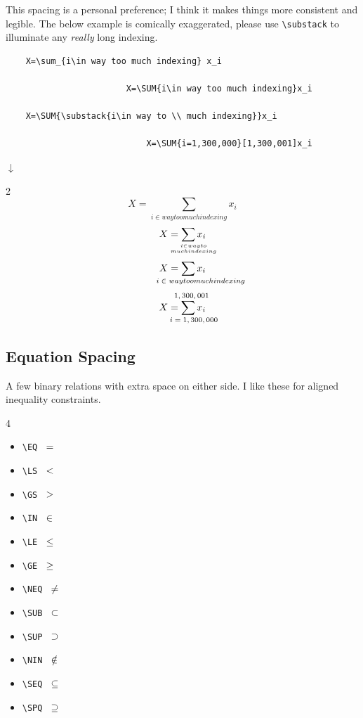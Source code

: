 \documentclass{article}
\begin{document}
This spacing is a personal preference; I think it makes things more consistent and legible. The below example is comically exaggerated, please use \verb|\substack| to illuminate any \emph{really} long indexing.
\begin{tcolorbox}
	\begin{verbatim}
	X=\sum_{i\in way too much indexing} x_i
	
	                    X=\SUM{i\in way too much indexing}x_i
	                    
	X=\SUM{\substack{i\in way to \\ much indexing}}x_i
	   
	                        X=\SUM{i=1,300,000}[1,300,001]x_i
	\end{verbatim}
	\begin{center}$\downarrow$\end{center}
	\begin{multicols}{2}~\VTRg\vtrg
	$$
	X=\sum_{i\in way too much indexing} x_i
	$$
	$$
	X=\SUM{\substack{i\in way to \\ much indexing}}x_i
	$$
	$$
	X=\SUM{i\in way too much indexing}x_i
	$$
	$$
	X=\SUM{i=1,300,000}[1,300,001]x_i
	$$
	\end{multicols}
\end{tcolorbox}



\subsection*{Equation Spacing}

A few binary relations with extra space on either side. I like these for aligned inequality constraints.
    \vtrg\begin{multicols}{4}
    \begin{itemize}
    	\item\verb|\EQ| $\hskip.5em\relax=\hskip.5em\relax$ 
        \item\verb|\LS| $\hskip.5em\relax<\hskip.5em\relax$ 
        \item\verb|\GS| $\hskip.5em\relax>\hskip.5em\relax$ 
        
        \item\verb|\IN| $\hskip.5em\relax\in\hskip.5em\relax$ 
        \item\verb|\LE| $\hskip.5em\relax\leq\hskip.5em\relax$ 
        \item\verb|\GE| $\hskip.5em\relax\geq\hskip.5em\relax$ 
        
        \item\verb|\NEQ| $\hskip.5em\relax\neq\hskip.5em\relax$
        \item\verb|\SUB| $\hskip.5em\relax\subset\hskip.5em\relax$
        \item\verb|\SUP| $\hskip.5em\relax\supset\hskip.5em\relax$
        
        \item\verb|\NIN| $\hskip.5em\relax\notin\hskip.5em\relax$
        \item\verb|\SEQ| $\hskip.5em\relax\subseteq\hskip.5em\relax$
        \item\verb|\SPQ| $\hskip.5em\relax\supseteq\hskip.5em\relax$
    \end{itemize}
    \end{multicols}\Vtrg\vtrg
\end{document}
